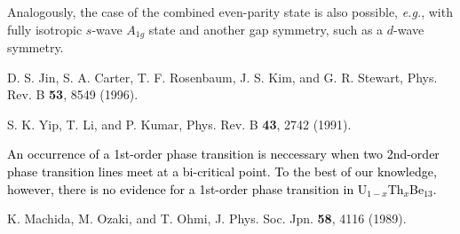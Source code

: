 \documentclass[twocolumn, prl]{revtex4}%
\newcommand{\correct}[1]{\textcolor{black}{#1}}
\begin{document}
\begin{thebibliography}{99}
 Analogously, the case of the combined even-parity  state  is also possible, \textit{e.g.},
  with  fully isotropic $s$-wave $A_{1g}$  state and another gap symmetry, such as a $d$-wave symmetry.





 D. S. Jin, S. A. Carter, T. F. Rosenbaum, J. S. Kim, and G. R. Stewart, Phys. Rev. B {\bf53}, 8549 (1996).

 S. K. Yip, T. Li, and P. Kumar, Phys. Rev. B {\bf 43}, 2742 (1991).

 \correct{
 An occurrence of a 1st-order phase transition is neccessary when two 2nd-order phase transition lines meet at a bi-critical point.  
To the best of our knowledge, however, there is no evidence for a 1st-order phase transition in U$_{1-x}$Th$_x$Be$_{13}$.}



  K. Machida, M. Ozaki, and T. Ohmi, J. Phys. Soc. Jpn. {\bf58}, 4116 (1989).
\end{thebibliography}
\end{document}
